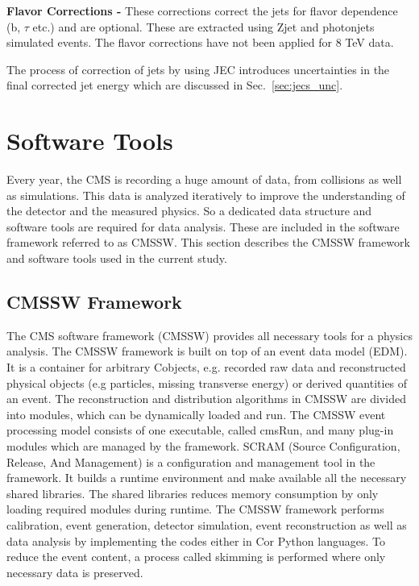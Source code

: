 {\bf Flavor Corrections -} These corrections correct the jets for flavor dependence (b, $\tau$ etc.) and are optional. These are extracted using Z\plusn jet and photon\plusn jets simulated events. The flavor corrections have not been applied for 8 TeV data.

The process of correction of jets by using JEC introduces uncertainties in the final corrected jet energy which are discussed in Sec.~\ref{sec:jecs_unc}.

\section{Software Tools}
Every year, the CMS is recording a huge amount of data, from collisions as well as simulations. This data is analyzed iteratively to improve the understanding of the detector and the measured physics. So a dedicated data structure and software tools are required for data analysis. These are included in the software framework referred to as CMSSW. This section describes the CMSSW framework and software tools used in the current study.

\subsection{CMSSW Framework}
The CMS software framework (CMSSW) \cite{CMS:2005aa} provides all necessary tools for a physics analysis. The CMSSW framework is built on top of an event data model (EDM). It is a container for arbitrary C\plusn\plus objects, e.g. recorded raw data and reconstructed physical objects (e.g particles, missing transverse energy) or derived quantities of an event. The reconstruction and distribution algorithms in CMSSW are divided into modules, which can be dynamically loaded and run. The CMSSW event processing model consists of one executable, called cmsRun, and many plug-in modules which are managed by the framework. SCRAM (Source Configuration, Release, And Management) is a configuration and management tool in the framework. It builds a runtime environment and make available all the necessary shared libraries. The shared libraries reduces memory consumption by only loading required modules during runtime. The CMSSW framework performs calibration, event generation, detector simulation, event reconstruction as well as data analysis by implementing the codes either in C\plusn\plus or Python languages. To reduce the event content, a process called skimming is performed where only necessary data is preserved. 

